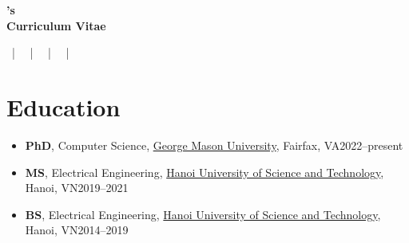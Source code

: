 \documentclass[11pt]{article}
\begin{document}
\thispagestyle{empty}

\begin{center}
    \textbf{\LARGE \myname{}'s\\\vspace{0.15in}Curriculum Vitae}
\end{center}

\begin{center}
    \myaddress ~|~ \myemailwork ~|~ \myphone ~|~ \mygooglescholar ~|~ \mywebsite 
\end{center}

\section{Education}

\begin{itemize}
    
    \item \textbf{PhD}, Computer Science,  \href{https://www.gmu.edu}{George Mason University}, Fairfax, VA\hfill 2022--present
    
    \item \textbf{MS}, Electrical Engineering, \href{https://www.hust.edu.vn/en/}{Hanoi University of Science and Technology}, Hanoi, VN\hfill 2019--2021
    
    \item \textbf{BS}, Electrical Engineering, \href{https://www.hust.edu.vn/en/}{Hanoi University of Science and Technology}, Hanoi, VN\hfill 2014--2019
    
\end{itemize}
\end{document}
